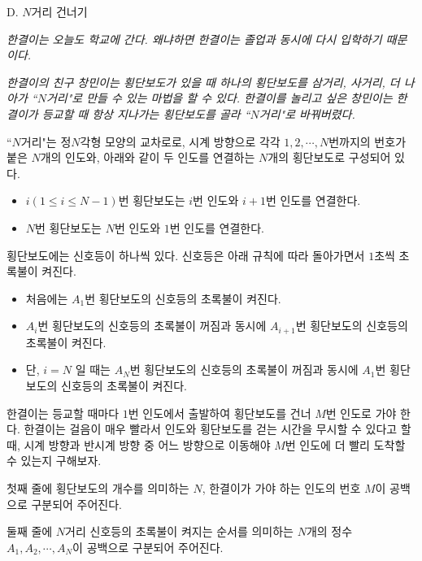 \def\probtitle{$N$거리 건너기}
\def\probno{D} %

\begin{problem}{\probno{}. \probtitle{}}

\textit{한결이는 오늘도 학교에 간다. 왜냐하면 한결이는 졸업과 동시에 다시 입학하기 때문이다.}

\textit{한결이의 친구 창민이는 횡단보도가 있을 때 하나의 횡단보도를 삼거리, 사거리, 더 나아가 ``$N$거리"로 만들 수 있는 마법을 할 수 있다. 한결이를 놀리고 싶은 창민이는 한결이가 등교할 때 항상 지나가는 횡단보도를 골라 ``$N$거리"로 바꿔버렸다.}

``$N$거리"는 정$N$각형 모양의 교차로로, 시계 방향으로 각각 $1, 2, \cdots, N$번까지의 번호가 붙은 $N$개의 인도와, 아래와 같이 두 인도를 연결하는 $N$개의 횡단보도로 구성되어 있다.

\begin{itemize}[topsep=0pt,noitemsep]
    \item $i (1 \le i \le N-1)$번 횡단보도는 $i$번 인도와 $i+1$번 인도를 연결한다.
    \item $N$번 횡단보도는 $N$번 인도와 $1$번 인도를 연결한다.
\end{itemize}

횡단보도에는 신호등이 하나씩 있다. 신호등은 아래 규칙에 따라 돌아가면서 $1$초씩 초록불이 켜진다.

\begin{itemize}[topsep=0pt,noitemsep]
    \item 처음에는 $A_1$번 횡단보도의 신호등의 초록불이 켜진다.
    \item $A_i$번 횡단보도의 신호등의 초록불이 꺼짐과 동시에 $A_{i+1}$번 횡단보도의 신호등의 초록불이 켜진다.
    \item 단, $i = N$ 일 때는 $A_N$번 횡단보도의 신호등의 초록불이 꺼짐과 동시에 $A_1$번 횡단보도의 신호등의 초록불이 켜진다.
\end{itemize}

한결이는 등교할 때마다 $1$번 인도에서 출발하여 횡단보도를 건너 $M$번 인도로 가야 한다. 한결이는 걸음이 매우 빨라서 인도와 횡단보도를 걷는 시간을 무시할 수 있다고 할 때, 시계 방향과 반시계 방향 중 어느 방향으로 이동해야 $M$번 인도에 더 빨리 도착할 수 있는지 구해보자.

\InputFile

첫째 줄에 횡단보도의 개수를 의미하는 $N$, 한결이가 가야 하는 인도의 번호 $M$이 공백으로 구분되어 주어진다.

둘째 줄에 $N$거리 신호등의 초록불이 켜지는 순서를 의미하는 $N$개의 정수 $A_1, A_2, \cdots, A_N$이 공백으로 구분되어 주어진다.


\end{problem}
